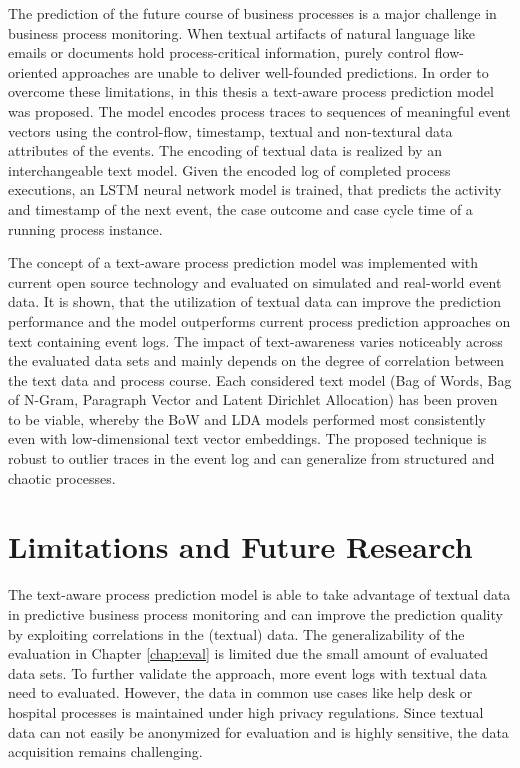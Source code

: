 The prediction of the future course of business processes is a major challenge in business process monitoring.
When textual artifacts of natural language like emails or documents hold process-critical information, purely control flow-oriented approaches are unable to deliver well-founded predictions.
In order to overcome these limitations, in this thesis a text-aware process prediction model was proposed.
The model encodes process traces to sequences of meaningful event vectors using the control-flow, timestamp, textual and non-textural data attributes of the events.
The encoding of textual data is realized by an interchangeable text model.
Given the encoded log of completed process executions, an LSTM neural network model is trained, that predicts the activity and timestamp of the next event, the case outcome and case cycle time of a running process instance.

The concept of a text-aware process prediction model was implemented with current open source technology and evaluated on simulated and real-world event data.
It is shown, that the utilization of textual data can improve the prediction performance and the model outperforms current process prediction approaches on text containing event logs.
The impact of text-awareness varies noticeably across the evaluated data sets and mainly depends on the degree of correlation between the text data and process course.
Each considered text model (Bag of Words, Bag of N-Gram, Paragraph Vector and Latent Dirichlet Allocation) has been proven to be viable, whereby the BoW and LDA models performed most consistently even with low-dimensional text vector embeddings.
The proposed technique is robust to outlier traces in the event log and can generalize from structured and chaotic processes.


\section{Limitations and Future Research}

The text-aware process prediction model is able to take advantage of textual data in predictive business process monitoring and can improve the prediction quality by exploiting correlations in the (textual) data.
The generalizability of the evaluation in Chapter \ref{chap:eval} is limited due the small amount of evaluated data sets.
To further validate the approach, more event logs with textual data need to evaluated.
However, the data in common use cases like help desk or hospital processes is maintained under high privacy regulations.
Since textual data can not easily be anonymized for evaluation and is highly sensitive, the data acquisition remains challenging.


